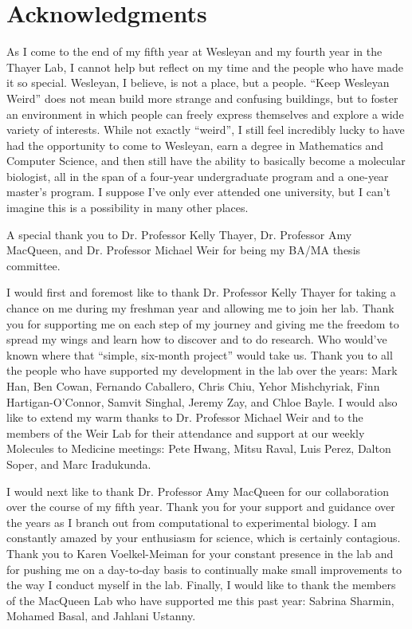 \documentclass[12pt,oneside]{book}
\let\cleardoublepage\clearpage
\begin{document}
{
\frontmatter

}

\cleardoublepage

\renewcommand{\thechapter}{\Roman{chapter}}

\chapter{Acknowledgments}

\setcounter{page}{1}

As I come to the end of my fifth year at Wesleyan and my fourth year in the Thayer Lab, I cannot help but reflect on my time and the people who have made it so special. Wesleyan, I believe, is not a place, but a people. ``Keep Wesleyan Weird'' does not mean build more strange and confusing buildings, but to foster an environment in which people can freely express themselves and explore a wide variety of interests. While not exactly ``weird'', I still feel incredibly lucky to have had the opportunity to come to Wesleyan, earn a degree in Mathematics and Computer Science, and then still have the ability to basically become a molecular biologist, all in the span of a four-year undergraduate program and a one-year master's program. I suppose I've only ever attended one university, but I can't imagine this is a possibility in many other places.

A special thank you to Dr. Professor Kelly Thayer, Dr. Professor Amy MacQueen, and Dr. Professor Michael Weir for being my BA/MA thesis committee.

I would first and foremost like to thank Dr. Professor Kelly Thayer for taking a chance on me during my freshman year and allowing me to join her lab. Thank you for supporting me on each step of my journey and giving me the freedom to spread my wings and learn how to discover and to do research. Who would've known where that ``simple, six-month project'' would take us. Thank you to all the people who have supported my development in the lab over the years: Mark Han, Ben Cowan, Fernando Caballero, Chris Chiu, Yehor Mishchyriak, Finn Hartigan-O'Connor, Samvit Singhal, Jeremy Zay, and Chloe Bayle. I would also like to extend my warm thanks to Dr. Professor Michael Weir and to the members of the Weir Lab for their attendance and support at our weekly Molecules to Medicine meetings: Pete Hwang, Mitsu Raval, Luis Perez, Dalton Soper, and Marc Iradukunda.

I would next like to thank Dr. Professor Amy MacQueen for our collaboration over the course of my fifth year. Thank you for your support and guidance over the years as I branch out from computational to experimental biology. I am constantly amazed by your enthusiasm for science, which is certainly contagious. Thank you to Karen Voelkel-Meiman for your constant presence in the lab and for pushing me on a day-to-day basis to continually make small improvements to the way I conduct myself in the lab. Finally, I would like to thank the members of the MacQueen Lab who have supported me this past year: Sabrina Sharmin, Mohamed Basal, and Jahlani Ustanny.
\end{document}
